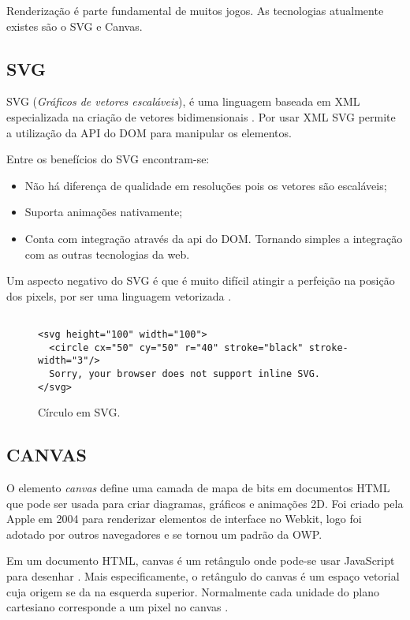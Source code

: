 Renderização é parte fundamental de muitos jogos. As tecnologias atualmente existes são o SVG e Canvas.

\subsection{SVG}
\begin{draft}
SVG (\textit{Gráficos de vetores escaláveis}), é uma linguagem
baseada em XML especializada na criação de vetores bidimensionais
\autocite{html5mostwanted}. Por usar XML SVG permite a utilização da
API do DOM para manipular os elementos.

Entre os benefícios do SVG encontram-se:
\begin{itemize}
\item Não há diferença de qualidade em resoluções pois os vetores são escaláveis;
\item Suporta animações nativamente;
\item Conta com integração através da api do DOM. Tornando simples a integração com as outras tecnologias da web.
\end{itemize}

Um aspecto negativo do SVG é que é muito difícil atingir a
perfeição na posição dos pixels, por ser uma linguagem vetorizada
\autocite{html5mostwanted}.

\end{draft}
\begin{figure}
\centering
\begin{verbatim}

<svg height="100" width="100">
  <circle cx="50" cy="50" r="40" stroke="black" stroke-width="3"/>
  Sorry, your browser does not support inline SVG.
</svg>

\end{verbatim}
\caption{Círculo em SVG.}
\end{figure}
\subsection{CANVAS}
O elemento \textit{canvas} define uma camada de mapa de bits em documentos
HTML que pode ser usada para criar diagramas, gráficos e animações
2D. Foi criado pela Apple em 2004 para renderizar elementos de interface
no Webkit, logo foi adotado por outros navegadores e se tornou um
padrão da OWP.

Em um documento HTML, canvas é um retângulo onde pode-se usar
JavaScript para desenhar \autocite[pp. 113]{diveIntohtml}. 
Mais especificamente, o retângulo do canvas é um espaço vetorial 
cuja origem se da na esquerda superior. Normalmente cada unidade do plano cartesiano corresponde a um pixel no canvas \autocite{mdnCanvas}.


